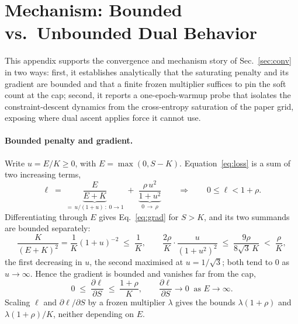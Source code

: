 \documentclass[10pt]{article}
\begin{document}



\appendix

\section{Mechanism: Bounded vs.\ Unbounded Dual Behavior}
\label{app:mech}

This appendix supports the convergence and mechanism story of
Sec.~\ref{sec:conv} in two ways: first, it establishes analytically that
the saturating penalty and its gradient are bounded and that a finite
frozen multiplier suffices to pin the soft count at the cap; second, it
reports a one-epoch-warmup probe that isolates the constraint-descent
dynamics from the cross-entropy saturation of the paper grid, exposing
where dual ascent applies force it cannot use.

{\color{blue}
\paragraph{Bounded penalty and gradient.}
Write $u=E/K\ge 0$, with $E=\max(0,S-K)$. Equation~\eqref{eq:loss} is a sum of two
increasing terms,
\[
\ell \;=\;
\underbrace{\frac{E}{E+K}}_{=\,u/(1+u)\,:\;0\to 1}
\;+\;
\underbrace{\frac{\rho\,u^{2}}{1+u^{2}}}_{0\,\to\,\rho}
\qquad\Longrightarrow\qquad
0\le\ell<1+\rho .
\]
Differentiating through $E$ gives Eq.~\eqref{eq:grad} for $S>K$, and its two summands are
bounded separately:
\[
\frac{K}{(E+K)^{2}}=\frac{1}{K}(1+u)^{-2}\;\le\;\frac{1}{K},
\qquad
\frac{2\rho}{K}\cdot\frac{u}{(1+u^{2})^{2}}\;\le\;\frac{9\rho}{8\sqrt3\,K}\;<\;\frac{\rho}{K},
\]
the first decreasing in $u$, the second maximised at $u=1/\sqrt3$; both tend to $0$ as
$u\to\infty$. Hence the gradient is bounded and vanishes far from the cap,
\[
0\;\le\;\frac{\partial\ell}{\partial S}\;\le\;\frac{1+\rho}{K},
\qquad
\frac{\partial\ell}{\partial S}\to 0 \ \text{ as } E\to\infty .
\]
Scaling $\ell$ and $\partial\ell/\partial S$ by a frozen multiplier $\lambda$ gives the
bounds $\lambda(1+\rho)$ and $\lambda(1+\rho)/K$, neither depending on $E$.
}
\end{document}
